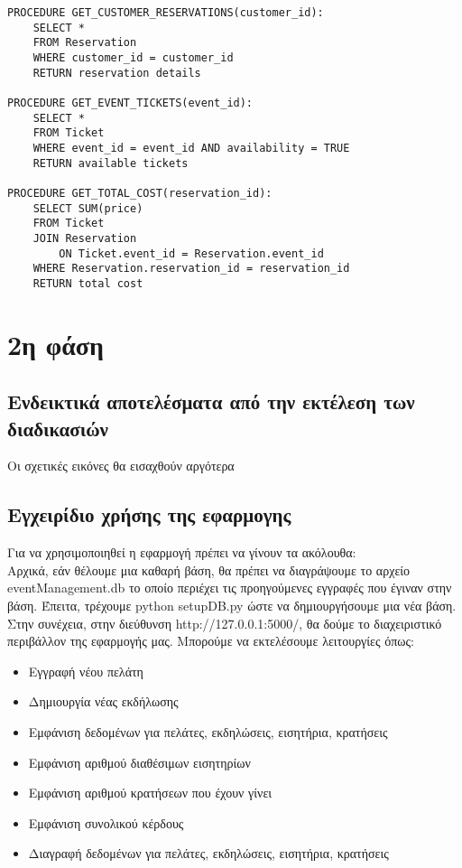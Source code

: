 \documentclass{article}
\begin{document}
\begin{lstlisting}
PROCEDURE GET_CUSTOMER_RESERVATIONS(customer_id):
    SELECT * 
    FROM Reservation 
    WHERE customer_id = customer_id
    RETURN reservation details

PROCEDURE GET_EVENT_TICKETS(event_id):
    SELECT * 
    FROM Ticket 
    WHERE event_id = event_id AND availability = TRUE
    RETURN available tickets

PROCEDURE GET_TOTAL_COST(reservation_id):
    SELECT SUM(price) 
    FROM Ticket 
    JOIN Reservation 
        ON Ticket.event_id = Reservation.event_id
    WHERE Reservation.reservation_id = reservation_id
    RETURN total cost

\end{lstlisting}
\section*{2η φάση}
\subsection*{Ενδεικτικά αποτελέσματα από την εκτέλεση των διαδικασιών}
Οι σχετικές εικόνες θα εισαχθούν αργότερα
\subsection*{Εγχειρίδιο χρήσης της εφαρμογης}
Για να χρησιμοποιηθεί η εφαρμογή πρέπει να γίνουν τα ακόλουθα:\\
Αρχικά, εάν θέλουμε μια καθαρή βάση, θα πρέπει να διαγράψουμε το αρχείο eventManagement.db το οποίο περιέχει τις προηγούμενες εγγραφές που έγιναν στην βάση. Έπειτα, τρέχουμε python setupDB.py ώστε να δημιουργήσουμε μια νέα βάση. Στην συνέχεια, στην διεύθυνση http://127.0.0.1:5000/, θα δούμε το διαχειριστικό περιβάλλον της εφαρμογής μας. Μπορούμε να εκτελέσουμε λειτουργίες όπως:\\
\begin{itemize}
	\item{Εγγραφή νέου πελάτη}
	\item{Δημιουργία νέας εκδήλωσης}
	\item{Εμφάνιση δεδομένων για πελάτες, εκδηλώσεις, εισητήρια, κρατήσεις}
	\item{Εμφάνιση αριθμού διαθέσιμων εισητηρίων}
	\item{Εμφάνιση αριθμού κρατήσεων που έχουν γίνει}
	\item{Εμφάνιση συνολικού κέρδους}
	\item{Διαγραφή δεδομένων για πελάτες, εκδηλώσεις, εισητήρια, κρατήσεις}
\end{itemize}
\end{document}
